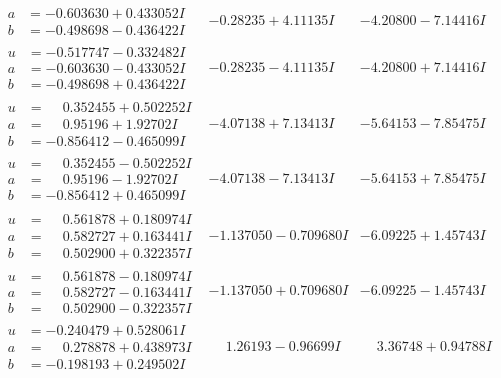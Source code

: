 \documentclass[1p]{elsarticle_modified}
\theoremstyle{definition}
\begin{document}
$$\begin{array}{c|c|c}
\begin{aligned}
a &= -0.603630 + 0.433052 I \\
b &= -0.498698 - 0.436422 I\end{aligned}
 & -0.28235 + 4.11135 I & -4.20800 - 7.14416 I \\ \hline\begin{aligned}
u &= -0.517747 - 0.332482 I \\
a &= -0.603630 - 0.433052 I \\
b &= -0.498698 + 0.436422 I\end{aligned}
 & -0.28235 - 4.11135 I & -4.20800 + 7.14416 I \\ \hline\begin{aligned}
u &= \phantom{-}0.352455 + 0.502252 I \\
a &= \phantom{-}0.95196 + 1.92702 I \\
b &= -0.856412 - 0.465099 I\end{aligned}
 & -4.07138 + 7.13413 I & -5.64153 - 7.85475 I \\ \hline\begin{aligned}
u &= \phantom{-}0.352455 - 0.502252 I \\
a &= \phantom{-}0.95196 - 1.92702 I \\
b &= -0.856412 + 0.465099 I\end{aligned}
 & -4.07138 - 7.13413 I & -5.64153 + 7.85475 I \\ \hline\begin{aligned}
u &= \phantom{-}0.561878 + 0.180974 I \\
a &= \phantom{-}0.582727 + 0.163441 I \\
b &= \phantom{-}0.502900 + 0.322357 I\end{aligned}
 & -1.137050 - 0.709680 I & -6.09225 + 1.45743 I \\ \hline\begin{aligned}
u &= \phantom{-}0.561878 - 0.180974 I \\
a &= \phantom{-}0.582727 - 0.163441 I \\
b &= \phantom{-}0.502900 - 0.322357 I\end{aligned}
 & -1.137050 + 0.709680 I & -6.09225 - 1.45743 I \\ \hline\begin{aligned}
u &= -0.240479 + 0.528061 I \\
a &= \phantom{-}0.278878 + 0.438973 I \\
b &= -0.198193 + 0.249502 I\end{aligned}
 & \phantom{-}1.26193 - 0.96699 I & \phantom{-}3.36748 + 0.94788 I\\

\end{array}$$
\end{document}
